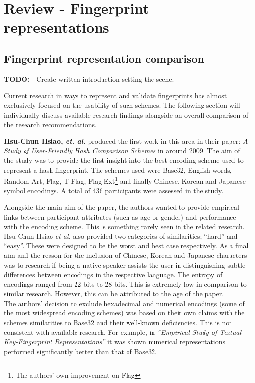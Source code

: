 \section{Review - Fingerprint representations}

\subsection{Fingerprint representation comparison}

\textbf{TODO: } - Create written introduction setting the scene.

Current research in ways to represent and validate fingerprints has almost exclusively focused on the usability of such schemes. The following section will individually discuss available research findings alongside an overall comparison of the research recommendations.

\textbf{Hsu-Chun Hsiao, \textit{et. al.}} produced the first work in this area in their paper: \textit{A Study of User-Friendly Hash Comparison Schemes}\cite{hsiao2009study} in around 2009. The aim of the study was to provide the first insight into the best encoding scheme used to represent a hash fingerprint. The schemes used were Base32, English words, Random Art\cite{perrig1999hash}, Flag\cite{ellison2003public}, T-Flag\cite{lin2010spate}, Flag Ext\footnote{The authors' own improvement on Flag} and finally Chinese, Korean and Japanese symbol encodings. A total of 436 participants were assessed in the study.

Alongside the main aim of the paper, the authors wanted to provide empirical links between participant attributes (such as age or gender) and performance with the encoding scheme. This is something rarely seen in the related research. Hsu-Chun Hsiao \textit{et al.} also provided two categories of similarities; ``hard'' and ``easy''. These were designed to be the worst and best case respectively. As a final aim and the reason for the inclusion of Chinese, Korean and Japanese characters was to research if being a native speaker assists the user in distinguishing subtle differences between encodings in the respective language. The entropy of encodings ranged from 22-bits to 28-bits. This is extremely low in comparison to similar research. However, this can be attributed to the age of the paper. \\
The authors' decision to exclude hexadecimal and numerical encodings (some of the most widespread encoding schemes) was based on their own claims with the schemes similarities to Base32 and their well-known deficiencies. This is not consistent with available research. For example, in \textit{``Empirical Study of Textual Key-Fingerprint Representations''}\cite{dechand2016empirical} it was shown numerical representations performed significantly better than that of Base32.

